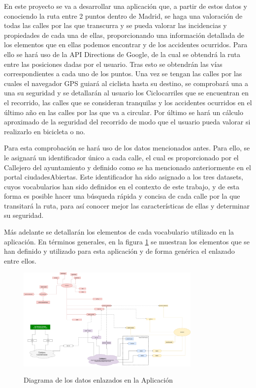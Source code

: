 En este proyecto se va a desarrollar una aplicación que, a partir de estos datos y conociendo la ruta entre 2 puntos dentro de Madrid, se haga una valoración de todas las calles por las que transcurra y se pueda valorar las incidencias y propiedades de cada una de ellas, proporcionando una información detallada de los elementos que en ellas podemos encontrar y de los accidentes ocurridos. Para ello se hará uso de la API Directions de Google, de la cual se obtendrá la ruta entre las posiciones dadas por el usuario. Tras esto se obtendrán las vías correspondientes a cada uno de los puntos. Una vez se tengan las calles por las cuales el navegador GPS guiará al ciclista hasta su destino, se comprobará una a una su seguridad y se detallarán al usuario los Ciclocarriles que se encuentran en el recorrido, las calles que se consideran tranquilas y los accidentes ocurridos en el último año en las calles por las que va a circular. Por último se hará un cálculo aproximado de la seguridad del recorrido de modo que el usuario pueda valorar si realizarlo en bicicleta o no.


Para esta comprobación se hará uso de los datos mencionados antes. Para ello, se le asignará un identificador único a cada calle, el cual es proporcionado por el Callejero del ayuntamiento \cite{datosmadrid_callejero} y definido como se ha mencionado anteriormente en el portal ciudadesAbiertas. Este identificador ha sido asignado a los tres datasets, cuyos vocabularios han sido definidos en el contexto de este trabajo, y de esta forma es posible hacer una búsqueda rápida y concisa de cada calle por la que transitará la ruta, para así conocer mejor las características de ellas y determinar su seguridad.


Más adelante se detallarán los elementos de cada vocabulario utilizado en la aplicación. En términos generales, en la figura \ref{fig:esquemaTotalVocab} se muestran los elementos que se han definido y utilizado para esta aplicación y de forma genérica el enlazado entre ellos.


\clearpage
\begin{figure}[h]
  \centering
  \includegraphics[angle=90, width=0.8\textwidth]{images/diagramaAppTotal.png} 
  \\
  \caption{Diagrama de los datos enlazados en la Aplicación}
  \label{fig:esquemaTotalVocab}
\end{figure}


